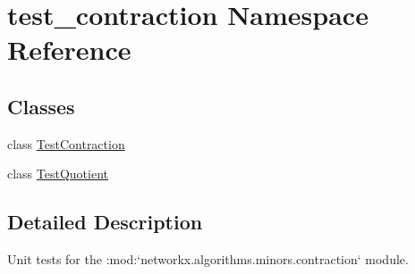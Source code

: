 \hypertarget{namespacetest__contraction}{}\section{test\+\_\+contraction Namespace Reference}
\label{namespacetest__contraction}
\subsection*{Classes}
\begin{DoxyCompactItemize}
\item 
class \hyperlink{classtest__contraction_1_1TestContraction}{Test\+Contraction}
\item 
class \hyperlink{classtest__contraction_1_1TestQuotient}{Test\+Quotient}
\end{DoxyCompactItemize}


\subsection{Detailed Description}
\begin{DoxyVerb}Unit tests for the :mod:`networkx.algorithms.minors.contraction` module.\end{DoxyVerb}
 
